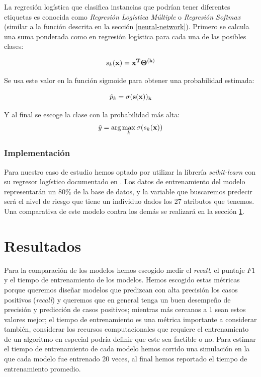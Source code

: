 \documentclass[journal]{IEEEtran}                                                          %
\begin{document}
                La regresión logística que clasifica instancias que podrían tener diferentes etiquetas es conocida como \emph{Regresión Logística Múltiple} o \emph{Regresión Softmax} (similar a la función descrita en la sección \ref{neural-network}). Primero se calcula una suma ponderada como en regresión logística para cada una de las posibles clases:

                \begin{equation}
                    s_k(\bf{x}) = \bf{x}^T \Theta^{(k)}
                \end{equation}

                Se usa este valor en la función sigmoide para obtener una probabilidad estimada:

                \begin{equation}
                    \hat{p}_k = \sigma(\bf{s}(\bf{x}))_k
                \end{equation}

                Y al final se escoge la clase con la probabilidad más alta:
                \begin{equation}
                    \hat{y} = \arg\max_k \sigma(s_k(\bf{x}))
                \end{equation}
            
            \subsubsection{Implementación}

                Para nuestro caso de estudio hemos optado por utilizar la librería \emph{scikit-learn} con su regresor logístico documentado en \cite{sci-kit-learn-no-dateB}. Los datos de entrenamiento del modelo representarán un 80\% de la base de datos, y la variable que buscaremos predecir será el nivel de riesgo que tiene un individuo dados los 27 atributos que tenemos. Una comparativa de este modelo contra los demás se realizará en la sección \ref{resultados}.

    \section{Resultados} \label{resultados}
        
        Para la comparación de los modelos hemos escogido medir el \emph{recall}, el puntaje $F1$ y el tiempo de entrenamiento de los modelos. Hemos escogido estas métricas porque queremos diseñar modelos que predizcan con alta precisión los casos positivos (\emph{recall}) y queremos que en general tenga un buen desempeño de precisión y predicción de casos positivos; mientras más cercanos a 1 sean estos valores mejor; el tiempo de entrenamiento es una métrica importante a considerar también, considerar los recursos computacionales que requiere el entrenamiento de un algoritmo en especial podría definir que este sea factible o no. Para estimar el tiempo de entrenamiento de cada modelo hemos corrido una simulación en la que cada modelo fue entrenado 20 veces, al final hemos reportado el tiempo de entrenamiento promedio.
        
\end{document}
